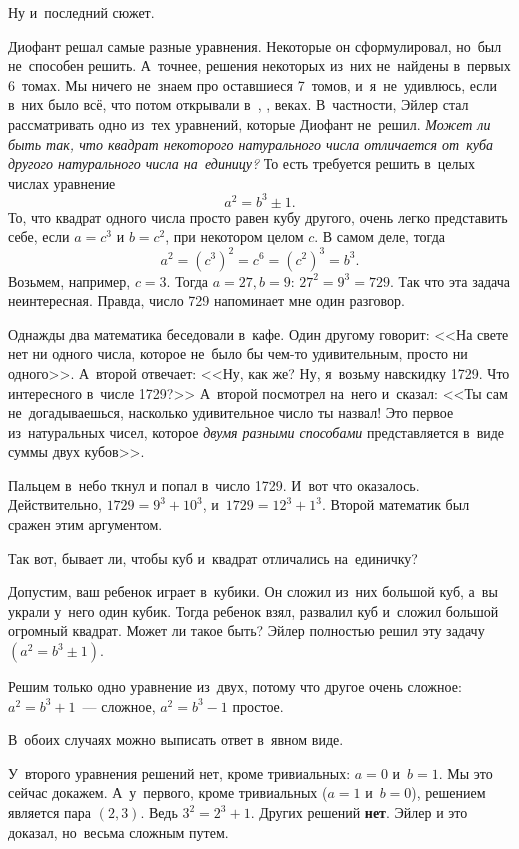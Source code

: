 Ну и~последний сюжет.

Диофант решал самые разные уравнения. Некоторые он сформулировал, но~был не~способен решить.
А~точнее, решения некоторых из~них не~найдены в~первых 6~томах. Мы ничего не~знаем про оставшиеся 7~томов,
и~я~не~удивлюсь, если в~них было всё, что потом открывали в~, ,  веках.
В~частности, Эйлер стал рассматривать одно из~тех уравнений, которые Диофант не~решил. \textit{Может ли быть
так, что квадрат некоторого натурального числа отличается от~куба другого натурального числа
на~единицу?} То есть требуется решить в~целых числах уравнение
$$
a^{2}=b^{3}\pm1.
$$
То, что квадрат одного числа просто равен кубу другого, очень легко представить себе, если
$a=c^{3}$ и $b=c^{2}$, при некотором целом $c$. В самом деле, тогда
$$
a^{2}=(c^{3})^{2}=c^{6}=(c^{2})^{3}=b^{3}.
$$
Возьмем, например, $c=3$. Тогда $a=27, b=9$: $27^{2} = 9^{3}=729$. Так что эта задача неинтересная. Правда,
число 729 напоминает мне один разговор.

Однажды два математика беседовали в~кафе. Один другому говорит: <<На свете нет ни одного числа,
которое не~было бы чем-то удивительным, просто ни одного>>. А~второй отвечает: <<Ну, как же? Ну,
я~возьму навскидку 1729. Что интересного в~числе 1729?>> А~второй посмотрел на~него и~сказал: <<Ты
сам не~догадываешься, насколько удивительное число ты назвал! Это первое из~натуральных чисел,
которое \textit{двумя разными способами} представляется в~виде суммы двух кубов>>.

Пальцем в~небо ткнул и попал
в~число 1729.
 И~вот что оказалось. Действительно, $1729 = 9^{3} + 10^{3}$, и~$1729=12^{3} +1^{3}$. Второй математик
был сражен этим аргументом.

Так вот, бывает ли, чтобы куб и~квадрат отличались на~единичку?

Допустим, ваш ребенок играет в~кубики. Он сложил из~них большой куб, а~вы украли у~него один кубик.
Тогда ребенок взял, развалил куб и~сложил большой огромный квадрат. Может ли такое быть? Эйлер
полностью решил эту задачу $(a^{2}=b^{3}\pm1)$.

Решим только одно уравнение из~двух, потому что другое очень сложное:
$a^{2}=b^{3}+1$~--- сложное,
$a^{2}=b^{3}-1$ простое.


В~обоих случаях можно выписать ответ в~явном виде.

У~второго уравнения решений нет, кроме тривиальных: $a=0$ и~$b=1$. Мы это сейчас докажем. А~у~первого,
кроме тривиальных ($a=1$ и~$b=0$), решением является пара $(2,3)$.
 Ведь $3^{2} = 2^{3}+1$. Других решений \textbf{нет}.
Эйлер и это доказал, но~весьма сложным путем.


